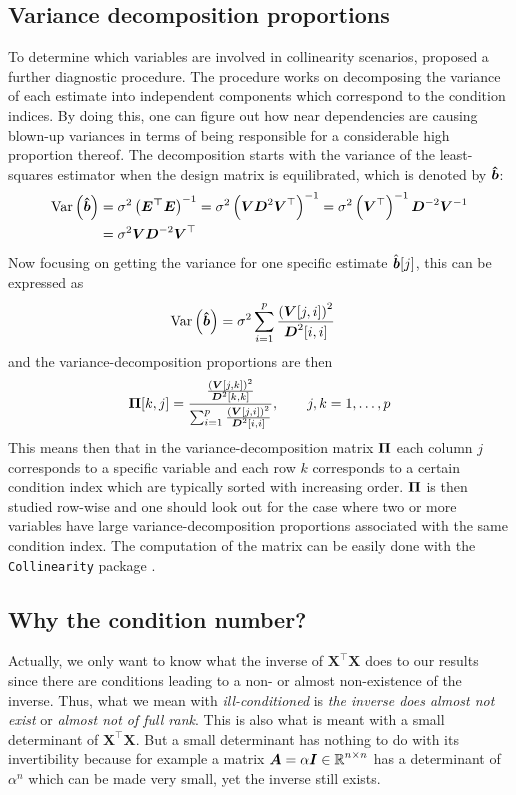 \documentclass[11pt,a4paper,twoside]{book}\usepackage[]{graphicx}\usepackage[]{xcolor}
\begin{document}
\subsection{Variance decomposition proportions}
To determine which variables are involved in collinearity scenarios, \cite{Belsley1991} proposed a further diagnostic procedure. The procedure works on decomposing the variance of each estimate into independent components which correspond to the condition indices. By doing this, one can figure out how near dependencies are causing blown-up variances in terms of being responsible for a considerable high proportion thereof. The decomposition starts with the variance of the least-squares estimator when the design matrix is equilibrated, which is denoted by ${\boldsymbol{\hat{{b}}}}$:
\begin{align*}
\operatorname{Var}\left({\boldsymbol{\hat{{b}}}}\right)
&=\sigma^2\left(\boldsymbol{E^\top E}\right)^{-1}=\sigma^2\left({\boldsymbol{V}}{\boldsymbol{D}}^2{\boldsymbol{V}}^\top\right)^{-1}=\sigma^2\left({\boldsymbol{V}}^\top\right)^{-1}{\boldsymbol{D}}^{-2}{\boldsymbol{V}}^{-1}\\
&=\sigma^2{\boldsymbol{V}}{\boldsymbol{D}}^{-2}{\boldsymbol{V}}^\top
\end{align*}
Now focusing on getting the variance for one specific estimate $\hat{{\textbf{\textit{b}}}}[j]$, this can be expressed as
\begin{align*}
\operatorname{Var}\left({\boldsymbol{\hat{{b}}}}\right)
&=\sigma^2\sum_{i=1}^{p}\frac{\left({\boldsymbol{V}}[j,i]\right)^2}{{\boldsymbol{D}}^2[i,i]}
\end{align*}
and the variance-decomposition proportions are then
\begin{align*}
{\boldsymbol{\Pi}}[k,j]=\frac{\frac{\left({\boldsymbol{V}}[j,k]\right)^2}{{\boldsymbol{D}}^2[k,k]}}{\sum_{i=1}^{p}\frac{\left({\boldsymbol{V}}[j,i]\right)^2}{{\boldsymbol{D}}^2[i,i]}},\qquad j,k=1,\dots,p
\end{align*}
This means then that in the variance-decomposition matrix ${\boldsymbol{\Pi}}$ each column $j$ corresponds to a specific variable and each row $k$ corresponds to a certain condition index which are typically sorted with increasing order. ${\boldsymbol{\Pi}}$ is then studied row-wise and one should look out for the case where two or more variables have large variance-decomposition proportions associated with the same condition index. The computation of the matrix can be easily done with the \texttt{Collinearity} package \citep{Collinearity}.

\subsection{Why the condition number?}

Actually, we only want to know what the inverse of $\boldsymbol{X^\top X}$ does to our results since there are conditions leading to a non- or almost non-existence of the inverse. Thus, what we mean with \textit{ill-conditioned} is \textit{the inverse does almost not exist} or \textit{almost not of full rank}. This is also what is meant with a small determinant of $\boldsymbol{X^\top X}$. But a small determinant has nothing to do with its invertibility because for example a matrix $\boldsymbol{A}=\alpha\boldsymbol{I}\in\operatorname{\mathbb{R}}^{n\times n}$ has a determinant of $\alpha^n$ which can be made very small, yet the inverse still exists.
\end{document}

